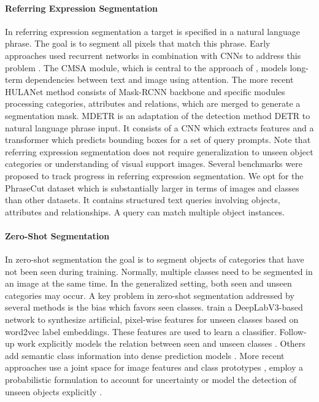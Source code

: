 \paragraph{Referring Expression Segmentation}

In referring expression segmentation a target is specified in a natural language phrase. The goal is to segment all pixels that match this phrase. Early approaches used recurrent networks in combination with CNNs to address this problem \cite{hu2016seg_nl, liu17refseg, shi18, li18referring}.
The CMSA module, which is central to the approach of \citet{ye19}, models long-term dependencies between text and image using attention.
The more recent HULANet method \cite{wu20phrasecut} consists of Mask-RCNN backbone and specific modules processing categories, attributes and relations, which are merged to generate a segmentation mask.
MDETR \cite{kamath21} is an adaptation of the detection method DETR \cite{carion20end} to natural language phrase input. It consists of a CNN which extracts features and a transformer which predicts bounding boxes for a set of query prompts. 
Note that referring expression segmentation does not require generalization to unseen object categories or understanding of visual support images.
Several benchmarks \cite{yu16modeling, mao16generation, wu20phrasecut} were proposed to track progress in referring expression segmentation. We opt for the PhraseCut dataset \cite{wu20phrasecut} which is substantially larger in terms of images and classes than other datasets. It contains structured text queries involving objects, attributes and relationships. A query can match multiple object instances.

\paragraph{Zero-Shot Segmentation}

In zero-shot segmentation the goal is to segment objects of categories that have not been seen during training. Normally, multiple classes need to be segmented in an image at the same time. In the generalized setting, both seen and unseen categories may occur. 
A key problem in zero-shot segmentation addressed by several methods is the bias which favors seen classes.
\citet{bucher19} train a DeepLabV3-based network to synthesize artificial, pixel-wise features for unseen classes based on word2vec label embeddings. These features are used to learn a classifier. 
Follow-up work explicitly models the relation between seen and unseen classes  \cite{li20}.
Others add semantic class information into dense prediction models \cite{xian19}.
More recent approaches use a joint space for image features and class prototypes \cite{baek21}, employ a probabilistic formulation to account for uncertainty \cite{hu20} or model the detection of unseen objects explicitly \cite{zhang21}.

